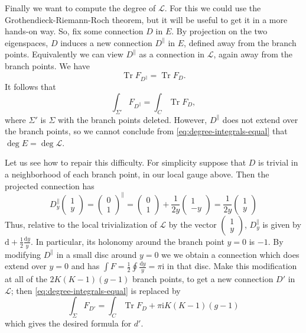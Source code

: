 \documentclass[12pt,letterpaper,reqno]{article}
\numberwithin{equation}{section}
\newcommand{\cL}{\ensuremath{\mathcal L}}
\newcommand{\half}{\ensuremath{\frac{1}{2}}}
\newcommand{\I}{{\mathrm i}}
\newcommand{\de}{\mathrm{d}}
\DeclareMathOperator{\Tr}{Tr}
\begin{document}
\begin{pf}
Finally we want to compute the degree of $\cL$.
For this we could use the Grothendieck-Riemann-Roch theorem,
but it will be useful to get it in a more hands-on way.
So, fix some connection $D$ in $E$.
By projection on the two eigenspaces, $D$ induces a new
connection $D^\parallel$ in $E$, defined away from the branch points.
Equivalently we can view $D^\parallel$ as a connection in $\cL$,
again away from the branch points. We have
\begin{equation}
   \Tr F_{D^\parallel} = \Tr F_D.
\end{equation}
It follows that
\begin{equation} \label{eq:degree-integrals-equal}
  \int_{\Sigma'} F_{D^\parallel} = \int_C \Tr F_D,
\end{equation}
where $\Sigma'$ is $\Sigma$ with the branch points deleted.
However, $D^\parallel$ does not extend
over the branch points, so we cannot conclude
from \eqref{eq:degree-integrals-equal} that
$\deg E = \deg \cL$.

Let us see how to repair this difficulty.
For simplicity suppose that
$D$ is trivial in a neighborhood of each branch point,
in our local gauge above. Then the projected connection
has
\begin{equation}
 D^\parallel_y \begin{pmatrix} 1 \\ y \end{pmatrix} = \begin{pmatrix} 0 \\ 1 \end{pmatrix}^\parallel = \begin{pmatrix} 0 \\ 1 \end{pmatrix} + \frac{1}{2y} \begin{pmatrix} 1 \\ -y \end{pmatrix} = \frac{1}{2y} \begin{pmatrix} 1 \\ y \end{pmatrix}
\end{equation}
Thus, relative to the local trivialization of $\cL$ by the
vector $\begin{pmatrix} 1 \\ y \end{pmatrix}$, $D_y^\parallel$
is given by $\de + \frac{1}{2} \frac{\de y}{y}$.
In particular, its holonomy around the branch point $y=0$
is $-1$.
By modifying $D^\parallel$ in a small disc around $y=0$
we we obtain a connection which does extend over $y = 0$
and has $\int F = \half \oint \frac{\de y}{y} = \pi \I$ in that disc.
Make this modification at all of the $2K(K-1)(g-1)$ branch points,
to get a new connection $D'$ in $\cL$;
then \eqref{eq:degree-integrals-equal} is replaced by
\begin{equation}
\int_{\Sigma} F_{D'} = \int_C \Tr F_D + \pi \I K(K-1)(g-1)
\end{equation}
which gives the desired formula for $d'$.


\end{pf}
\end{document}
